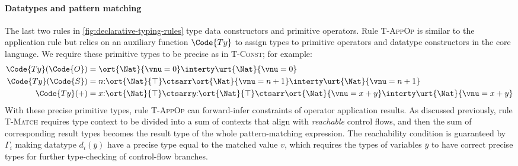 \paragraph{Datatypes and pattern matching} The last two rules
in \autoref{fig:declarative-typing-rules} type data constructors and
primitive operators. Rule \textsc{T-AppOp} is similar to the
application rule but relies on an auxiliary function $\Code{Ty}$ to
assign types to primitive operators and datatype constructors in the
core language. We require these primitive types to be precise as in
\textsc{T-Const}; for example:
\begin{align*}
  \Code{Ty}(\Code{O}) &= \ort{\Nat}{\vnu = 0} \interty \urt{\Nat}{\vnu = 0}
  \\\Code{Ty}(\Code{S}) &= n{:}\ort{\Nat}{\top} \ctsarr \ort{\Nat}{\vnu = n+1} \interty \urt{\Nat}{\vnu = n + 1}
  \\\Code{Ty}(+) &= x{:}\ort{\Nat}{\top} \ctsarr y{:}\ort{\Nat}{\top} \ctsarr \ort{\Nat}{\vnu = x+y} \interty \urt{\Nat}{\vnu = x + y}
\end{align*}\noindent
With these precise primitive types, rule \textsc{T-AppOp} can forward-infer constraints of operator application results. As discussed previously, rule \textsc{T-Match} requires type context to be divided into a sum of contexts that align with \emph{reachable} control flows, and then the sum of corresponding result types becomes the result type of the whole pattern-matching expression. The reachability condition is guaranteed by $\Gamma_i$ making datatype $d_i(\overline{y})$ have a precise type equal to the matched value $v$, which requires the types of variables $\overline{y}$ to have correct precise types for further type-checking of control-flow branches.

